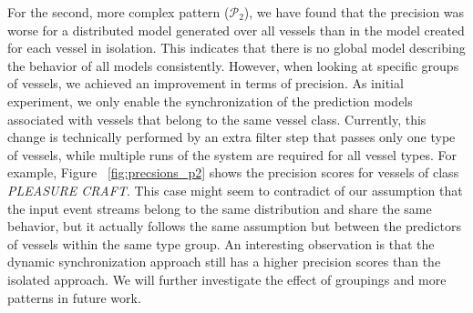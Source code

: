 \par For the second, more complex pattern ($\mathcal{P}_2$), we have found that the precision was worse for a distributed model generated over all vessels than in the model created for each vessel in isolation. This indicates that there is no  global model describing the behavior of all models consistently. However, when looking at specific groups of vessels, we achieved an improvement in terms of precision. As initial experiment, we only enable the synchronization of the prediction models associated with vessels that belong to the same vessel class. Currently, this change is technically performed by an extra filter step that passes only one type of vessels, while multiple runs of the system are required for all vessel types. For example, Figure ~\ref{fig:precsions_p2} shows the precision scores for vessels of class \textit{PLEASURE CRAFT}. This case might seem to contradict of our assumption that the input event streams belong to the same distribution and share the same behavior, but it actually follows the same assumption but between the predictors of vessels within the same type group. An interesting observation is that the dynamic synchronization approach still has a higher precision scores than the isolated approach. We will further investigate the effect of groupings and more patterns in future work.































%


 
